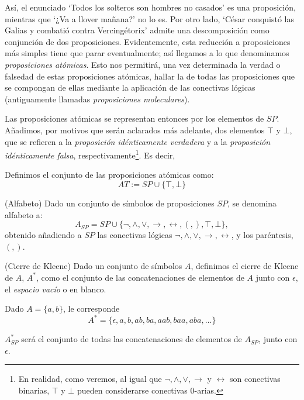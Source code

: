 Así, el enunciado `Todos los solteros son hombres no casados' es una proposición, mientras que `¿Va a llover mañana?' no lo es. Por otro lado, `César conquistó las Galias y combatió contra Vercingétorix' admite una descomposición como conjunción de dos proposiciones. Evidentemente, esta reducción a proposiciones más simples tiene que parar eventualmente; así llegamos a lo que denominamos \textit{proposiciones atómicas}. Esto nos permitirá, una vez determinada la verdad o falsedad de estas proposiciones atómicas, hallar la de todas las proposiciones que se compongan de ellas mediante la aplicación de las conectivas lógicas (antiguamente llamadas \textit{proposiciones moleculares}). \

Las proposiciones atómicas se representan entonces por los elementos de $SP$. Añadimos, por motivos que serán aclarados más adelante, dos elementos $\top$ y $\bot$, que se refieren a la \textit{proposición idénticamente verdadera} y a la \textit{proposición idénticamente falsa}, respectivamente\footnote{En realidad, como veremos, al igual que $\neg,\land,\lor,\to$ y $\leftrightarrow$ son conectivas binarias, $\top$ y $\bot$ pueden considerarse conectivas 0-arias.}. Es decir, 

\begin{definition}\label{def : at}

     Definimos el conjunto de las proposiciones atómicas como:
    \[
        AT := SP\cup \{\top, \bot\}
    \]
\end{definition}


\begin{definition}(Alfabeto)
    Dado un conjunto de símbolos de proposiciones $SP$, se denomina alfabeto a:
    \[
        A_{SP} = SP\cup\{\neg, \land, \lor, \rightarrow, \leftrightarrow, (, ),\top, \bot\},
    \]
    obtenido añadiendo a $SP$ las conectivas lógicas $\neg, \land, \lor, \rightarrow, \leftrightarrow$, y los paréntesis, $(,)$.
\end{definition}    

\begin{definition}(Cierre de Kleene)
    Dado un conjunto de símbolos $A$, definimos el cierre de Kleene de $A$, $A^*$, como el conjunto de las concatenaciones de elementos de $A$ junto con $\epsilon$, el \textit{espacio vacío} o en blanco.
\end{definition}

\begin{example} Dado $A = \{a, b\}$, le corresponde 
\[
    A^* = \{\epsilon, a, b, ab, ba, aab, baa, aba, ...\}
\]
\end{example}
\begin{example}
    $A_{SP}^*$ será el conjunto de todas las concatenaciones de elementos de $A_{SP}$, junto con $\epsilon$.
\end{example}

